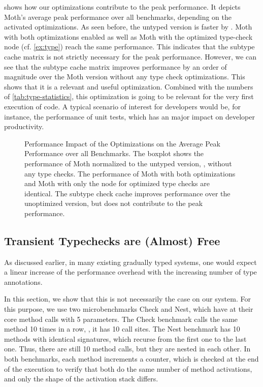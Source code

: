  shows how our optimizations contribute
to the peak performance.
It depicts Moth's average peak performance over
all benchmarks, depending on the activated optimizations.
As seen before, the untyped version is faster by \OverheadTypingGMeanP.
Moth with both optimizations enabled as well as
Moth with the optimized type-check node (cf. \cref{ex:type})
reach the same performance.
This indicates that the subtype cache matrix is not strictly necessary for
the peak performance.
However, we can see that the subtype cache matrix improves performance
by an order of magnitude over the Moth version without any type check optimizations.
This shows that it is a relevant and useful optimization.
Combined with the numbers of \cref{tab:type-statistics},
this optimization is going to be relevant for the very first execution of code.
A typical scenario of interest for developers would be, for instance, the
performance of unit tests, which has an major impact on developer productivity.

\begin{figure}[htb]
  \centering
	\OptimizationOverview{}
  \caption{Performance Impact of the Optimizations on the Average Peak Performance over all Benchmarks.
  The boxplot shows the performance of Moth normalized to the untyped version, \ie,
  without any type checks.
  The performance of Moth with both optimizations and Moth
  with only the node for optimized type checks are identical.
  The subtype check cache improves performance over the unoptimized version,
  but does not contribute to the peak performance.
  }
	\label{fig:perf-impact-optimization}
\end{figure}


\subsection{Transient Typechecks are (Almost) Free}

As discussed earlier, in many existing gradually typed systems,
one would expect a linear increase of the performance overhead
with the increasing number of type annotations.

In this section, we show that this is not necessarily the case on our system.
For this purpose, we use two microbenchmarks Check and Nest,
which have at their core method calls with 5 parameters.
The Check benchmark calls the same method 10 times in a row, \ie, it has 10 call sites.
The Nest benchmark has 10 methods with identical signatures,
which recurse from the first one to the last one.
Thus, there are still 10 method calls, but they are nested in each other.
In both benchmarks, each method increments a counter,
which is checked at the end of the execution to verify that both do the same
number of method activations, and only the shape of the activation stack differs.

